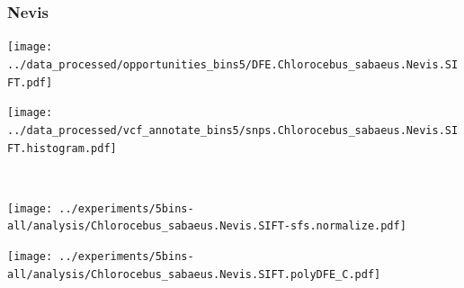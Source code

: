 \subsubsection{Nevis}

\begin{minipage}{0.49\linewidth}
    \texttt{[image: ../data\_processed/opportunities\_bins5/DFE.Chlorocebus\_sabaeus.Nevis.SIFT.pdf]}
\end{minipage}
\begin{minipage}{0.49\linewidth}
    \texttt{[image: ../data\_processed/vcf\_annotate\_bins5/snps.Chlorocebus\_sabaeus.Nevis.SIFT.histogram.pdf]}
\end{minipage}
\\
\begin{minipage}{0.49\linewidth}
    \texttt{[image: ../experiments/5bins-all/analysis/Chlorocebus\_sabaeus.Nevis.SIFT-sfs.normalize.pdf]}
\end{minipage}
\begin{minipage}{0.4\linewidth}
    \texttt{[image: ../experiments/5bins-all/analysis/Chlorocebus\_sabaeus.Nevis.SIFT.polyDFE\_C.pdf]}
\end{minipage}
